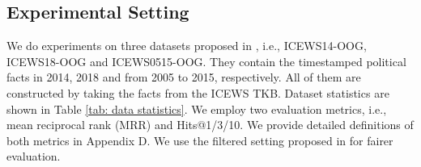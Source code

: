 \documentclass[runningheads]{llncs}
\begin{document}
\subsection{Experimental Setting}
We do experiments on three datasets proposed in \cite{ding2022few}, i.e., ICEWS14-OOG, ICEWS18-OOG and ICEWS0515-OOG. They contain the timestamped political facts in 2014, 2018 and from 2005 to 2015, respectively. All of them are constructed by taking the facts from the ICEWS \cite{DVN/28075_2015} TKB. Dataset statistics are shown in Table \ref{tab: data statistics}. We employ two evaluation metrics, i.e., mean reciprocal rank (MRR) and Hits@1/3/10. 
We provide detailed definitions of both metrics in Appendix D. We use the filtered setting proposed in \cite{DBLP:conf/nips/BordesUGWY13} for fairer evaluation.
\end{document}
